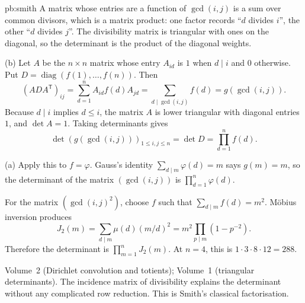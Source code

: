 \begin{solution}{pb:smith}
\idea A matrix whose entries are a function of $\gcd(i,j)$ is a sum over common divisors, which is a matrix product: one
factor records ``$d$ divides $i$'', the other ``$d$ divides $j$''. The divisibility matrix is triangular with ones on the
diagonal, so the determinant is the product of the diagonal weights.

\writeup (b) Let $A$ be the $n\times n$ matrix whose entry $A_{id}$ is $1$ when $d\mid i$ and $0$ otherwise. Put $D=\operatorname{diag}(f(1),\ldots,f(n))$. Then
\[
(ADA^{\mathsf T})_{ij}=\sum_{d=1}^n A_{id}f(d)A_{jd}
=\sum_{d\mid\gcd(i,j)}f(d)=g(\gcd(i,j)).
\]
Because $d\mid i$ implies $d\le i$, the matrix $A$ is lower triangular with diagonal entries $1$, and $\det A=1$. Taking determinants gives
\[
\det(g(\gcd(i,j)))_{1\le i,j\le n}=\det D=\prod_{d=1}^nf(d).
\]

(a) Apply this to $f=\varphi$. Gauss's identity $\sum_{d\mid m}\varphi(d)=m$ says $g(m)=m$, so the determinant of the matrix $(\gcd(i,j))$ is $\prod_{d=1}^n\varphi(d)$.

For the matrix $(\gcd(i,j)^2)$, choose $f$ such that $\sum_{d\mid m}f(d)=m^2$. Möbius inversion produces
\[
J_2(m)=\sum_{d\mid m}\mu(d)(m/d)^2
=m^2\prod_{p\mid m}(1-p^{-2}).
\]
Therefore the determinant is $\prod_{m=1}^nJ_2(m)$. At $n=4$, this is $1\cdot3\cdot8\cdot12=288$.

\tools Volume~2 (Dirichlet convolution and totients); Volume~1 (triangular determinants).
\leads The incidence matrix of divisibility explains the determinant without any complicated row reduction. This is Smith's classical factorisation.
\end{solution}

